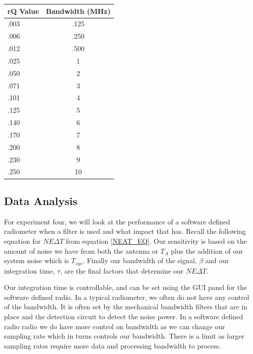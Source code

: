 {\begin{table}[h!tb] \centering
{}
\label{exp4_datapoints}
\begin{tabular}{lc} \hline
\textbf{rQ Value} & \textbf{Bandwidth (MHz)} \\ \hline
.003 & .125 \\
.006 & .250 \\
.012 & .500 \\
.025 & 1 \\
.050 & 2 \\
.071 & 3 \\
.101 & 4 \\
.125 & 5 \\
.140 & 6 \\
.170 & 7 \\
.200 & 8 \\
.230 & 9 \\
.250 & 10 \\ \hline
\end{tabular}
\end{table}

\subsection{Data Analysis}

For experiment four, we will look at the performance of a software defined radiometer when a filter is used and what impact that has.  Recall the following equation for $NE\Delta T$ from equation \ref{NEAT_EQ}.  Our sensitivity is based on the amount of noise we have from both the antenna or $T_{A}$ plus the addition of our system noise which is $T_{sys}$.  Finally our bandwidth of the signal, $\beta$ and our integration time, $\tau$, are the final factors that determine our $NE\Delta T$.

Our integration time is controllable, and can be set using the GUI panel for the software defined radio.  In a typical radiometer, we often do not have any control of the bandwidth.  It is often set by the mechanical bandwidth filters that are in place and the detection circuit to detect the noise power.  In a software defined radio radio we do have more control on bandwidth as we can change our sampling rate which in turns controls our bandwidth.  There is a limit as larger sampling rates require more data and processing bandwidth to process.  

}
